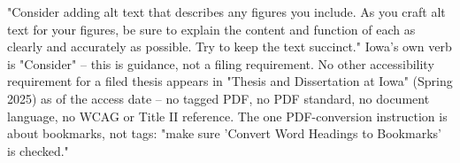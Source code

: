 	{"Consider adding alt text that describes any figures you include. As you
	 craft alt text for your figures, be sure to explain the content and function
	 of each as clearly and accurately as possible. Try to keep the text
	 succinct." Iowa's own verb is "Consider" -- this is guidance, not a filing
	 requirement.}
	{No other accessibility requirement for a filed thesis appears in "Thesis and
	 Dissertation at Iowa" (Spring 2025) as of the access date -- no tagged PDF,
	 no PDF standard, no document language, no WCAG or Title II reference. The
	 one PDF-conversion instruction is about bookmarks, not tags: "make sure
	 'Convert Word Headings to Bookmarks' is checked."}

